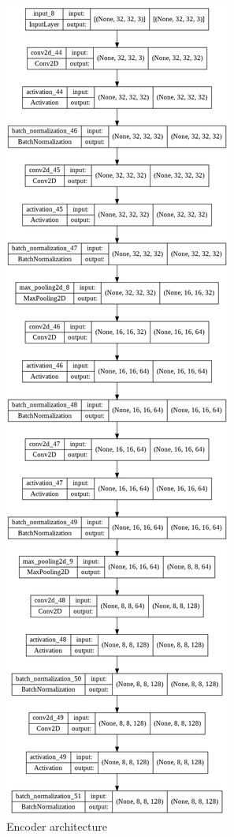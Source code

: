         \begin{figure}[h]
        	\centering
        	\includegraphics[width=0.35\linewidth]{images/encoder.png}
        	\caption{Encoder architecture }
        	\label{n}
        \end{figure}



